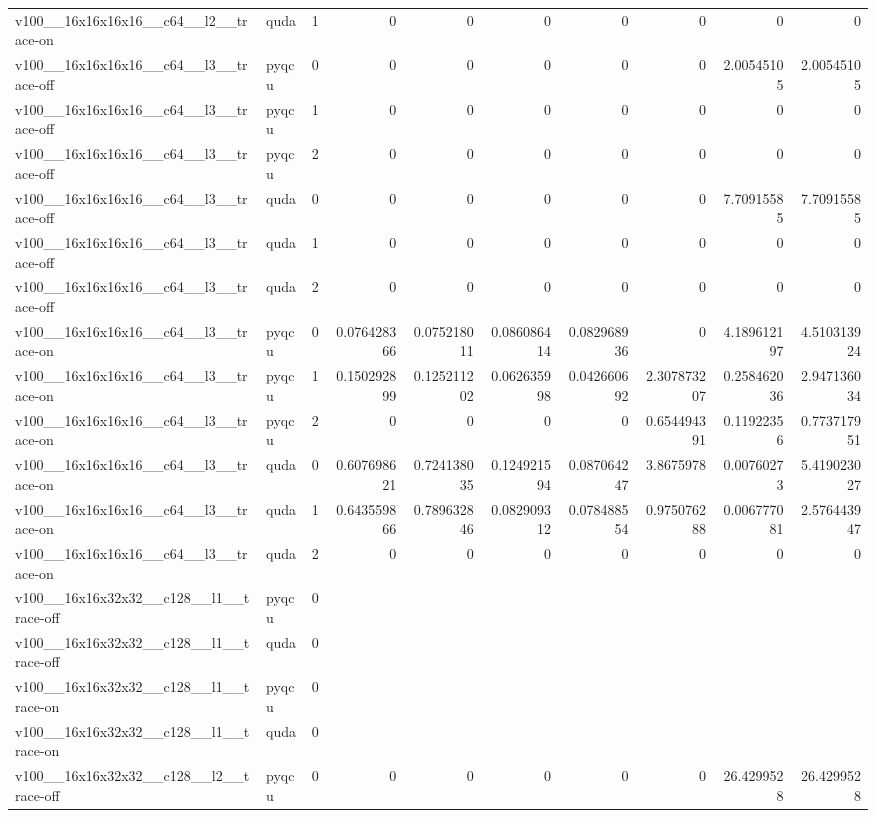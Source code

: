 \begin{table}[htbp]
\begin{tabular}{@{}llrrrrrrrr@{}}
v100\_\_16x16x16x16\_\_c64\_\_l2\_\_trace-on & quda & 1 & 0 & 0 & 0 & 0 & 0 & 0 & 0 \\
v100\_\_16x16x16x16\_\_c64\_\_l3\_\_trace-off & pyqcu & 0 & 0 & 0 & 0 & 0 & 0 & 2.00545105 & 2.00545105 \\
v100\_\_16x16x16x16\_\_c64\_\_l3\_\_trace-off & pyqcu & 1 & 0 & 0 & 0 & 0 & 0 & 0 & 0 \\
v100\_\_16x16x16x16\_\_c64\_\_l3\_\_trace-off & pyqcu & 2 & 0 & 0 & 0 & 0 & 0 & 0 & 0 \\
v100\_\_16x16x16x16\_\_c64\_\_l3\_\_trace-off & quda & 0 & 0 & 0 & 0 & 0 & 0 & 7.70915585 & 7.70915585 \\
v100\_\_16x16x16x16\_\_c64\_\_l3\_\_trace-off & quda & 1 & 0 & 0 & 0 & 0 & 0 & 0 & 0 \\
v100\_\_16x16x16x16\_\_c64\_\_l3\_\_trace-off & quda & 2 & 0 & 0 & 0 & 0 & 0 & 0 & 0 \\
v100\_\_16x16x16x16\_\_c64\_\_l3\_\_trace-on & pyqcu & 0 & 0.076428366 & 0.075218011 & 0.086086414 & 0.082968936 & 0 & 4.189612197 & 4.510313924 \\
v100\_\_16x16x16x16\_\_c64\_\_l3\_\_trace-on & pyqcu & 1 & 0.150292899 & 0.125211202 & 0.062635998 & 0.042660692 & 2.307873207 & 0.258462036 & 2.947136034 \\
v100\_\_16x16x16x16\_\_c64\_\_l3\_\_trace-on & pyqcu & 2 & 0 & 0 & 0 & 0 & 0.654494391 & 0.11922356 & 0.773717951 \\
v100\_\_16x16x16x16\_\_c64\_\_l3\_\_trace-on & quda & 0 & 0.607698621 & 0.724138035 & 0.124921594 & 0.087064247 & 3.8675978 & 0.00760273 & 5.419023027 \\
v100\_\_16x16x16x16\_\_c64\_\_l3\_\_trace-on & quda & 1 & 0.643559866 & 0.789632846 & 0.082909312 & 0.078488554 & 0.975076288 & 0.006777081 & 2.576443947 \\
v100\_\_16x16x16x16\_\_c64\_\_l3\_\_trace-on & quda & 2 & 0 & 0 & 0 & 0 & 0 & 0 & 0 \\
v100\_\_16x16x32x32\_\_c128\_\_l1\_\_trace-off & pyqcu & 0 &  &  &  &  &  &  &  \\
v100\_\_16x16x32x32\_\_c128\_\_l1\_\_trace-off & quda & 0 &  &  &  &  &  &  &  \\
v100\_\_16x16x32x32\_\_c128\_\_l1\_\_trace-on & pyqcu & 0 &  &  &  &  &  &  &  \\
v100\_\_16x16x32x32\_\_c128\_\_l1\_\_trace-on & quda & 0 &  &  &  &  &  &  &  \\
v100\_\_16x16x32x32\_\_c128\_\_l2\_\_trace-off & pyqcu & 0 & 0 & 0 & 0 & 0 & 0 & 26.4299528 & 26.4299528 \\

\end{tabular}
\end{table}
